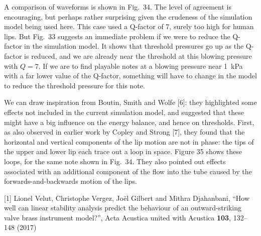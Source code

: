  A comparison of waveforms is shown in Fig.\ 34. The level of agreement is 
  encouraging, but perhaps rather surprising given the crudeness of the 
  simulation model being used here. This case used a Q-factor of 7, surely too 
  high for human lips. But Fig.\ 33 suggests an immediate problem if we were to 
  reduce the Q-factor in the simulation model. It shows that threshold 
  pressures go up as the Q-factor is reduced, and we are already near the 
  threshold at this blowing pressure with $Q=7$. If we are to find playable 
  notes at a blowing pressure near 1~kPa with a far lower value of the 
  Q-factor, something will have to change in the model to reduce the threshold 
  pressure for this note. 


  We can draw inspiration from Boutin, Smith and Wolfe [6]: they highlighted 
  some effects not included in the current simulation model, and suggested that 
  these might have a big influence on the energy balance, and hence on 
  thresholds. First, as also observed in earlier work by Copley and Strong [7], 
  they found that the horizontal and vertical components of the lip motion are 
  not in phase: the tips of the upper and lower lip each trace out a loop in 
  space. Figure 35 shows these loops, for the same note shown in Fig.\ 34. They 
  also pointed out effects associated with an additional component of the flow 
  into the tube caused by the forwards-and-backwards motion of the lips. 




  \sectionreferences{}[1] Lionel Velut, Christophe Vergez, Joël Gilbert and 
  Mithra Djahanbani, “How well can linear stability analysis predict the 
  behaviour of an outward-striking valve brass instrument model?”, Acta 
  Acustica united with Acustica \textbf{103}, 132–148 (2017) 

